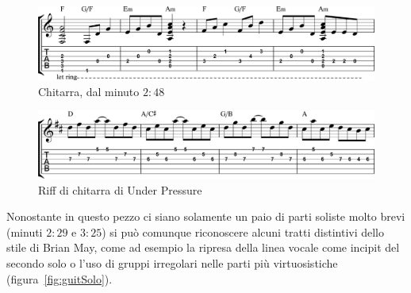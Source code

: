 \documentclass[12pt]{article}
\begin{document}
\begin{figure}[H]
 \centering
 \includegraphics[width=\textwidth,keepaspectratio]{guitars/guit1}
 \caption{Chitarra, dal minuto \(2:48\)}
 \label{fig:guitArp}
\end{figure}

\begin{figure}[H]
 \centering
 \includegraphics[width=\textwidth,keepaspectratio]{guitars/pressure}
 \caption{Riff di chitarra di Under Pressure}
 \label{fig:guitPres}
\end{figure}

Nonostante in questo pezzo ci siano solamente un paio di parti soliste molto brevi (minuti \(2:29\) e \(3:25\)) si può comunque riconoscere alcuni tratti distintivi dello stile di Brian May, come ad esempio la ripresa della linea vocale come incipit del secondo solo o l'uso di gruppi irregolari nelle parti più virtuosistiche (figura~\ref{fig:guitSolo}).
\end{document}
